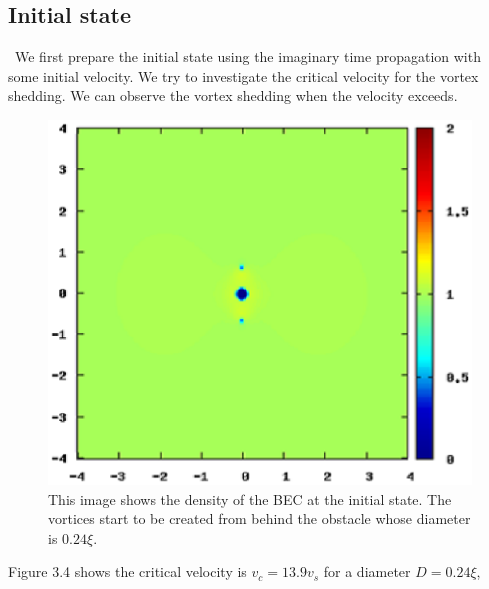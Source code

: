 \documentclass[12pt,a4paper]{report} %
\begin{document}
\subsection{Initial state}
\ We first prepare the initial state using the imaginary time propagation with some initial velocity.
We try to investigate the critical velocity for the vortex shedding.
We can observe the vortex shedding when the velocity exceeds.
\begin{figure}[htbp]\begin{center}
\includegraphics[scale=0.6,keepaspectratio]{3-4.eps}
\caption{
This image shows the density of the BEC at the initial state.
The vortices start to be created from behind the obstacle whose diameter is $0.24\xi$.
}
\label{FIG:3-4}
\end{center}\end{figure}
Figure 3.4 shows the critical velocity is $v_c = 13.9v_s$ for a diameter $D = 0.24\xi$,
\end{document}
